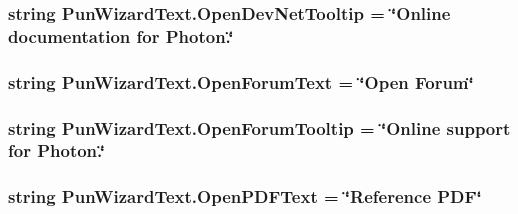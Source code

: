 \subsubsection[{\texorpdfstring{Open\+Dev\+Net\+Tooltip}{OpenDevNetTooltip}}]{\setlength{\rightskip}{0pt plus 5cm}string Pun\+Wizard\+Text.\+Open\+Dev\+Net\+Tooltip = \char`\"{}Online documentation for Photon.\char`\"{}}\hypertarget{class_pun_wizard_text_afc24da1439691f6ccce7508b7a477098}{}\label{class_pun_wizard_text_afc24da1439691f6ccce7508b7a477098}
\subsubsection[{\texorpdfstring{Open\+Forum\+Text}{OpenForumText}}]{\setlength{\rightskip}{0pt plus 5cm}string Pun\+Wizard\+Text.\+Open\+Forum\+Text = \char`\"{}Open Forum\char`\"{}}\hypertarget{class_pun_wizard_text_aad4c0f1272271f27aae937366ab5c13f}{}\label{class_pun_wizard_text_aad4c0f1272271f27aae937366ab5c13f}
\subsubsection[{\texorpdfstring{Open\+Forum\+Tooltip}{OpenForumTooltip}}]{\setlength{\rightskip}{0pt plus 5cm}string Pun\+Wizard\+Text.\+Open\+Forum\+Tooltip = \char`\"{}Online support for Photon.\char`\"{}}\hypertarget{class_pun_wizard_text_a30aab510bbdee48dbe991522241a3e4a}{}\label{class_pun_wizard_text_a30aab510bbdee48dbe991522241a3e4a}
\subsubsection[{\texorpdfstring{Open\+P\+D\+F\+Text}{OpenPDFText}}]{\setlength{\rightskip}{0pt plus 5cm}string Pun\+Wizard\+Text.\+Open\+P\+D\+F\+Text = \char`\"{}Reference P\+DF\char`\"{}}\hypertarget{class_pun_wizard_text_aed4fa569a6a67715a4e87c1a9479c5e5}{}\label{class_pun_wizard_text_aed4fa569a6a67715a4e87c1a9479c5e5}
